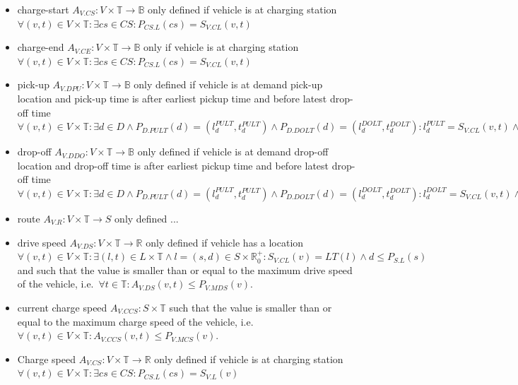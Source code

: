 \documentclass[graybox]{svmult}
\begin{document}
\begin{itemize}
	\item charge-start $A_{V.CS}: V \times \mathbb{T} \rightarrow \mathbb{B}$ only defined if vehicle is at charging station $\forall (v,t) \in V \times \mathbb{T}: \exists cs \in CS: P_{CS.L}(cs) = S_{V.CL}(v, t)$
	\item charge-end $A_{V.CE}: V \times \mathbb{T} \rightarrow \mathbb{B}$ only if vehicle is at charging station $\forall (v,t) \in V \times \mathbb{T}: \exists cs \in CS: P_{CS.L}(cs) = S_{V.CL}(v, t)$
	\item pick-up $A_{V.DPU}: V \times \mathbb{T} \rightarrow \mathbb{B}$ only defined if vehicle is at demand pick-up location and pick-up time is after earliest pickup time and before latest drop-off time $\forall (v,t) \in V \times \mathbb{T}: \exists d \in D \wedge  P_{D.PULT}(d) = (l_d^{PULT},t_d^{PULT}) \wedge P_{D.DOLT}(d) = (l_d^{DOLT},t_d^{DOLT}): l_d^{PULT} = S_{V.CL}(v,t) \wedge t_d^{PULT} \leq t \leq t_d^{DOLT}$
	\item drop-off $A_{V.DDO}: V \times \mathbb{T} \rightarrow \mathbb{B}$ only defined if vehicle is at demand drop-off location and drop-off time is after earliest pickup time and before latest drop-off time $\forall (v,t) \in V \times \mathbb{T}: \exists d \in D \wedge  P_{D.PULT}(d) = (l_d^{PULT},t_d^{PULT}) \wedge P_{D.DOLT}(d) = (l_d^{DOLT},t_d^{DOLT}): l_d^{DOLT} = S_{V.CL}(v,t) \wedge t_d^{PULT} \leq t \leq t_d^{DOLT}$
	\item route $A_{V.R}: V \times \mathbb{T} \rightarrow S$ only defined ...
	\item drive speed $A_{V.DS}: V \times \mathbb{T} \rightarrow \mathbb{R}$ only defined if vehicle has a location $\forall (v,t) \in V \times \mathbb{T}: \exists (l, t) \in L \times \mathbb{T} \wedge l = (s, d) \in S \times \mathbb{R}_0^+: S_{V.CL}(v) = LT(l) \wedge d \leq P_{S.L}(s)$ and such that the value is smaller than or equal to the maximum drive speed of the vehicle, i.e.\ $\forall t \in \mathbb{T}: A_{V.DS}(v,t) \leq P_{V.MDS}(v)$.
		\item current charge speed $A_{V.CCS}: S \times \mathbb{T}$ such that the value is smaller than or equal to the maximum charge speed of the vehicle, i.e.\ $\forall (v,t) \in V \times \mathbb{T}: A_{V.CCS}(v,t) \leq P_{V.MCS}(v)$.
	

	
	\item Charge speed $A_{V.CS}: V \times \mathbb{T} \rightarrow \mathbb{R}$ only defined if vehicle is at charging station $\forall (v,t) \in V \times \mathbb{T}: \exists cs \in CS: P_{CS.L}(cs) = S_{V.L}(v)$
\end{itemize}
\end{document}
